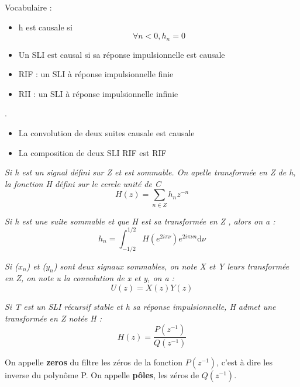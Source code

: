 \begin{defn}[Causalité] Vocabulaire : \\
\begin{itemize}
\item h est causale si $$\forall n<0, h_{n}=0$$
\item Un SLI est causal si sa réponse impulsionnelle est causale
\item RIF : un SLI à réponse impulsionnelle finie
\item RII : un SLI à réponse impulsionnelle infinie
\end{itemize}
\end{defn}

\begin{pop} .\\
\begin{itemize}
\item La convolution de deux suites causale est causale
\item La composition de deux SLI RIF est RIF 
\end{itemize}
\end{pop}

\begin{defn}[Transformée en Z]
\textit{Si h est un signal défini sur Z et est sommable. On apelle transformée en Z de h, la fonction H défini sur le cercle unité de C} $$H(z) = \sum_{n\in Z} h_{n}z^{-n}$$
\end{defn}

\begin{pop}
\textit{Si h est une suite sommable et que H est sa transformée en Z , alors on a :}
$$h_{n}= \int_{-1/2}^{1/2}H(e^{2i\pi \nu})e^{2i\pi \nu n}\mathrm{d}\nu$$
\end{pop}

\begin{pop}
\textit{Si ($x_{n}$) et ($y_{n}$) sont deux signaux sommables, on note X et Y leurs transformée en Z, on note u la convolution de x et y, on a :}$$U(z)=X(z)Y(z)$$
\end{pop}

\begin{pop}
\textit{Si T est un SLI récursif stable et h sa réponse impulsionnelle, H admet une transformée en Z notée H :}
$$H(z) = \dfrac{P(z^{-1})}{Q(z^{-1})} $$
\end{pop}

\begin{defn} On appelle \textbf{zeros} du filtre les zéros de la fonction $P(z^{-1})$, c'est à dire les inverse du polynôme P. On appelle \textbf{pôles}, les zéros de $Q(z^{-1})$.
\end{defn}

